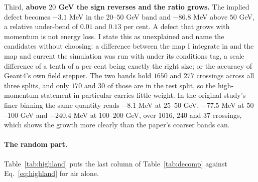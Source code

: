 \documentclass[11pt,a4paper]{article}
\begin{document}
Third, \textbf{above $20$ GeV the sign reverses and the ratio grows.} The
implied defect becomes $-3.1$ MeV in the $20$--$50$ GeV band and $-86.8$ MeV
above $50$ GeV, a relative under-bend of $0.01$ and $0.13$ per cent. A defect
that grows with momentum is not energy loss. I state this as unexplained and
name the candidates without choosing: a difference between the map I integrate
in and the map and current the simulation was run with under its conditions tag,
a scale difference of a tenth of a per cent being exactly the right size; or the
accuracy of Geant4's own field stepper. The two bands hold $1650$ and $277$
crossings across all three splits, and only $170$ and $30$ of those are in the
test split, so the high-momentum statement in particular carries little weight.
In the original study's finer binning the same quantity reads $-8.1$ MeV at
$25$--$50$ GeV, $-77.5$ MeV at $50$--$100$ GeV and $-240.4$ MeV at
$100$--$200$ GeV, over $1016$, $240$ and $37$ crossings, which shows the growth
more clearly than the paper's coarser bands can.

\paragraph{The random part.} Table~\ref{tab:highland} puts the last column of
Table~\ref{tab:decomp} against Eq.~\eqref{eq:highland} for air alone.
\end{document}
